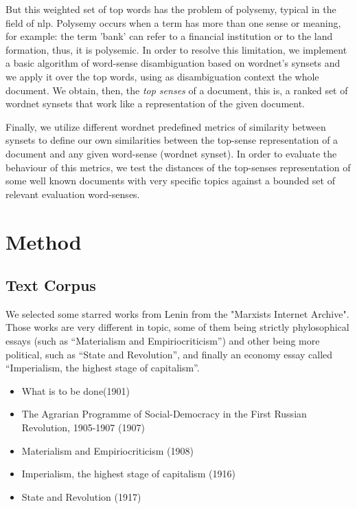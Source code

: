 \documentclass{pnastwo}
\begin{document}
\begin{article}
But this weighted set of top words has the problem of polysemy, typical in the field of nlp. Polysemy occurs when a term has more than one sense or meaning, for example: the term 'bank' can refer to a financial institution or to the land formation, thus, it is polysemic. In order to resolve this limitation, we implement a basic algorithm of word-sense disambiguation based on wordnet's synsets and we apply it over the top words, using as disambiguation context the whole document. We obtain, then, the \textit{top senses} of a document, this is, a ranked set of wordnet synsets that work like a representation of the given document.

Finally, we utilize different wordnet predefined metrics of similarity between synsets to define our own similarities between the top-sense representation of a document and any given word-sense (wordnet synset). In order to evaluate the behaviour of this metrics, we test the distances of the top-senses representation of some well known documents with very specific topics against a bounded set of relevant evaluation word-senses. 


\section{Method}
\subsection{Text Corpus}

We selected some starred works from Lenin from the "Marxists Internet Archive"\cite{LENIN}. Those works are very different in topic, some of them being strictly phylosophical essays (such as ``Materialism and Empiriocriticism'') and other being more political, such as ``State and Revolution'', and finally an economy essay called ``Imperialism, the highest stage of capitalism''. 

\begin{itemize}
  \item What is to be done(1901)
  \item The Agrarian Programme of Social-Democracy in the First Russian Revolution, 1905-1907 (1907)
  \item Materialism and Empiriocriticism (1908)
  \item Imperialism, the highest stage of capitalism (1916)
  \item State and Revolution (1917)
\end{itemize}


\end{article}
\end{document}
